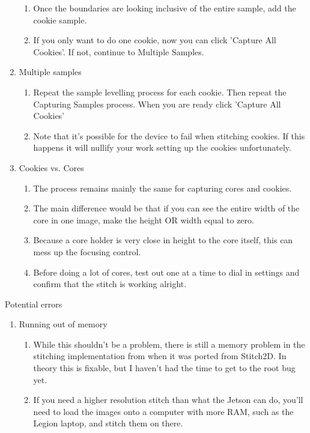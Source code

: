 \documentclass{article}
\begin{document}
\begin{outline}[enumerate]
\begin{enumerate}
\begin{enumerate}
            \item Once the boundaries are looking inclusive of the entire sample, add the cookie sample.
            \item If you only want to do one cookie, now you can click 'Capture All Cookies'. If not, continue to Multiple Samples.
        \end{enumerate}
    \item Multiple samples
		\begin{enumerate}
		\item Repeat the sample levelling process for each cookie. Then repeat the Capturing Samples process. When you are ready click 'Capture All Cookies'
        \item Note that it's possible for the device to fail when stitching cookies. If this happens it will nullify your work setting up the cookies unfortunately. 
        \end{enumerate}
    \item Cookies vs. Cores
        \begin{enumerate}
            \item The process remains mainly the same for capturing cores and cookies.
            \item The main difference would be that if you can see the entire width of the core in one image, make the height OR width equal to zero.
            \item Because a core holder is very close in height to the core itself, this can mess up the focusing control. 
            \item Before doing a lot of cores, test out one at a time to dial in settings and confirm that the stitch is working alright.
        \end{enumerate}
	\end{enumerate}
\item Potential errors
    \begin{enumerate}
    \item Running out of memory
        \begin{enumerate}
        \item While this shouldn't be a problem, there is still a memory problem in the stitching implementation from when it was ported from Stitch2D. In theory this is fixable, but I haven't had the time to get to the root bug yet.
        \item If you need a higher resolution stitch than what the Jetson can do, you'll need to load the images onto a computer with more RAM, such as the Legion laptop, and stitch them on there. 

\end{enumerate}
\end{enumerate}
\end{outline}
\end{document}
